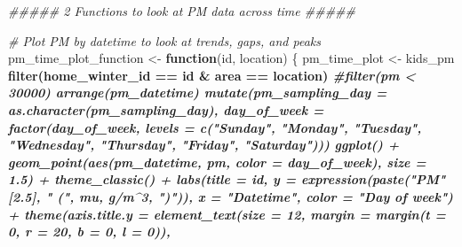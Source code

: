 \documentclass[
]{article}
\newenvironment{Shaded}{\begin{snugshade}}{\end{snugshade}}
\newcommand{\CommentTok}[1]{\textcolor[rgb]{0.56,0.35,0.01}{\textit{#1}}}
\newcommand{\ControlFlowTok}[1]{\textcolor[rgb]{0.13,0.29,0.53}{\textbf{#1}}}
\newcommand{\DataTypeTok}[1]{\textcolor[rgb]{0.13,0.29,0.53}{#1}}
\newcommand{\DecValTok}[1]{\textcolor[rgb]{0.00,0.00,0.81}{#1}}
\newcommand{\FloatTok}[1]{\textcolor[rgb]{0.00,0.00,0.81}{#1}}
\newcommand{\KeywordTok}[1]{\textcolor[rgb]{0.13,0.29,0.53}{\textbf{#1}}}
\newcommand{\NormalTok}[1]{#1}
\newcommand{\OperatorTok}[1]{\textcolor[rgb]{0.81,0.36,0.00}{\textbf{#1}}}
\newcommand{\StringTok}[1]{\textcolor[rgb]{0.31,0.60,0.02}{#1}}
\begin{document}
\begin{Shaded}
\begin{Highlighting}[]
\CommentTok{##### 2 Functions to look at PM data across time #####}

\CommentTok{# Plot PM by datetime to look at trends, gaps, and peaks}
\NormalTok{pm_time_plot_function <-}\StringTok{ }\ControlFlowTok{function}\NormalTok{(id, location) \{}
\NormalTok{pm_time_plot <-}\StringTok{ }\NormalTok{kids_pm }\OperatorTok{%>%}\StringTok{ }
\StringTok{  }\KeywordTok{filter}\NormalTok{(home_winter_id }\OperatorTok{==}\StringTok{ }\NormalTok{id }\OperatorTok{&}\StringTok{ }\NormalTok{area }\OperatorTok{==}\StringTok{ }\NormalTok{location) }\OperatorTok{%>%}\StringTok{ }
\StringTok{  }\CommentTok{#filter(pm < 30000) %>% }
\StringTok{  }\KeywordTok{arrange}\NormalTok{(pm_datetime) }\OperatorTok{%>%}\StringTok{ }
\StringTok{  }\KeywordTok{mutate}\NormalTok{(}\DataTypeTok{pm_sampling_day =} \KeywordTok{as.character}\NormalTok{(pm_sampling_day),}
         \DataTypeTok{day_of_week =} \KeywordTok{factor}\NormalTok{(day_of_week,}
                              \DataTypeTok{levels =} \KeywordTok{c}\NormalTok{(}\StringTok{"Sunday"}\NormalTok{, }\StringTok{"Monday"}\NormalTok{, }\StringTok{"Tuesday"}\NormalTok{, }\StringTok{"Wednesday"}\NormalTok{, }
                                         \StringTok{"Thursday"}\NormalTok{, }\StringTok{"Friday"}\NormalTok{, }\StringTok{"Saturday"}\NormalTok{))) }\OperatorTok{%>%}
\StringTok{  }\KeywordTok{ggplot}\NormalTok{() }\OperatorTok{+}\StringTok{ }
\StringTok{    }\KeywordTok{geom_point}\NormalTok{(}\KeywordTok{aes}\NormalTok{(pm_datetime, pm, }\DataTypeTok{color =}\NormalTok{ day_of_week), }\DataTypeTok{size =} \FloatTok{1.5}\NormalTok{) }\OperatorTok{+}
\StringTok{    }\KeywordTok{theme_classic}\NormalTok{() }\OperatorTok{+}
\StringTok{    }\KeywordTok{labs}\NormalTok{(}\DataTypeTok{title =}\NormalTok{ id,}
         \DataTypeTok{y =} \KeywordTok{expression}\NormalTok{(}\KeywordTok{paste}\NormalTok{(}\StringTok{"PM"}\NormalTok{[}\FloatTok{2.5}\NormalTok{], }\StringTok{" ("}\NormalTok{, mu, g}\OperatorTok{/}\NormalTok{m}\OperatorTok{^}\DecValTok{3}\NormalTok{, }\StringTok{")"}\NormalTok{)),}
         \DataTypeTok{x =} \StringTok{"Datetime"}\NormalTok{,}
         \DataTypeTok{color =} \StringTok{"Day of week"}\NormalTok{) }\OperatorTok{+}
\StringTok{    }\KeywordTok{theme}\NormalTok{(}\DataTypeTok{axis.title.y =} \KeywordTok{element_text}\NormalTok{(}\DataTypeTok{size =} \DecValTok{12}\NormalTok{,}
                                      \DataTypeTok{margin =} \KeywordTok{margin}\NormalTok{(}\DataTypeTok{t =} \DecValTok{0}\NormalTok{, }\DataTypeTok{r =} \DecValTok{20}\NormalTok{, }\DataTypeTok{b =} \DecValTok{0}\NormalTok{, }\DataTypeTok{l =} \DecValTok{0}\NormalTok{)),}
}}}}}
\end{Highlighting}
\end{Shaded}
\end{document}
